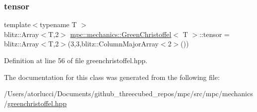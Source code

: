 \subsubsection{\texorpdfstring{tensor}{tensor}}
{\footnotesize\ttfamily template$<$typename T $>$ \\
blitz\+::\+Array$<$T,2$>$ \mbox{\hyperlink{structmpc_1_1mechanics_1_1_green_christoffel}{mpc\+::mechanics\+::\+Green\+Christoffel}}$<$ T $>$\+::tensor = blitz\+::\+Array$<$T,2$>$(3,3,blitz\+::\+Column\+Major\+Array$<$2$>$())}



Definition at line 56 of file greenchristoffel.\+hpp.



The documentation for this class was generated from the following file\+:\begin{DoxyCompactItemize}
\item 
/\+Users/atorlucci/\+Documents/github\+\_\+threecubed\+\_\+repos/mpc/src/mpc/mechanics/\mbox{\hyperlink{greenchristoffel_8hpp}{greenchristoffel.\+hpp}}\end{DoxyCompactItemize}
